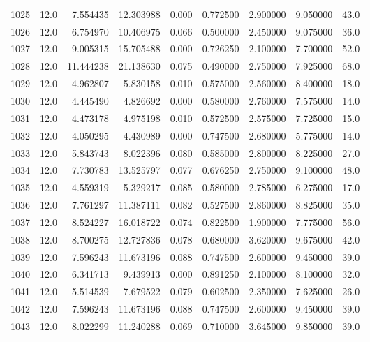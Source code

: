 \begin{tabular}{lrrrrrrrr}
1025 &   12.0 &   7.554435 &  12.303988 &  0.000 &  0.772500 &  2.900000 &   9.050000 &   43.0 \\
1026 &   12.0 &   6.754970 &  10.406975 &  0.066 &  0.500000 &  2.450000 &   9.075000 &   36.0 \\
1027 &   12.0 &   9.005315 &  15.705488 &  0.000 &  0.726250 &  2.100000 &   7.700000 &   52.0 \\
1028 &   12.0 &  11.444238 &  21.138630 &  0.075 &  0.490000 &  2.750000 &   7.925000 &   68.0 \\
1029 &   12.0 &   4.962807 &   5.830158 &  0.010 &  0.575000 &  2.560000 &   8.400000 &   18.0 \\
1030 &   12.0 &   4.445490 &   4.826692 &  0.000 &  0.580000 &  2.760000 &   7.575000 &   14.0 \\
1031 &   12.0 &   4.473178 &   4.975198 &  0.010 &  0.572500 &  2.575000 &   7.725000 &   15.0 \\
1032 &   12.0 &   4.050295 &   4.430989 &  0.000 &  0.747500 &  2.680000 &   5.775000 &   14.0 \\
1033 &   12.0 &   5.843743 &   8.022396 &  0.080 &  0.585000 &  2.800000 &   8.225000 &   27.0 \\
1034 &   12.0 &   7.730783 &  13.525797 &  0.077 &  0.676250 &  2.750000 &   9.100000 &   48.0 \\
1035 &   12.0 &   4.559319 &   5.329217 &  0.085 &  0.580000 &  2.785000 &   6.275000 &   17.0 \\
1036 &   12.0 &   7.761297 &  11.387111 &  0.082 &  0.527500 &  2.860000 &   8.825000 &   35.0 \\
1037 &   12.0 &   8.524227 &  16.018722 &  0.074 &  0.822500 &  1.900000 &   7.775000 &   56.0 \\
1038 &   12.0 &   8.700275 &  12.727836 &  0.078 &  0.680000 &  3.620000 &   9.675000 &   42.0 \\
1039 &   12.0 &   7.596243 &  11.673196 &  0.088 &  0.747500 &  2.600000 &   9.450000 &   39.0 \\
1040 &   12.0 &   6.341713 &   9.439913 &  0.000 &  0.891250 &  2.100000 &   8.100000 &   32.0 \\
1041 &   12.0 &   5.514539 &   7.679522 &  0.079 &  0.602500 &  2.350000 &   7.625000 &   26.0 \\
1042 &   12.0 &   7.596243 &  11.673196 &  0.088 &  0.747500 &  2.600000 &   9.450000 &   39.0 \\
1043 &   12.0 &   8.022299 &  11.240288 &  0.069 &  0.710000 &  3.645000 &   9.850000 &   39.0 \\

\end{tabular}
